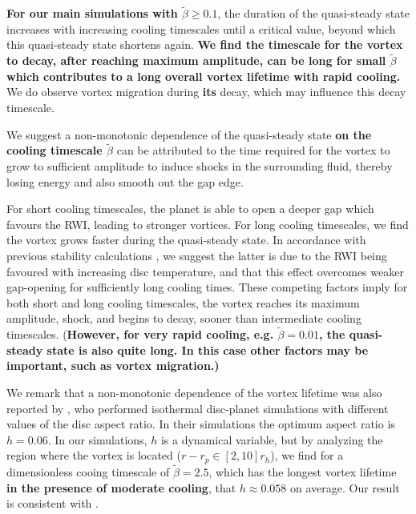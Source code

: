 {\bf For our main simulations with $\tilde{\beta}\geq 0.1$}, the duration of the quasi-steady state increases with
increasing cooling timescales until a critical value, beyond which this
quasi-steady state shortens again. {\bf We find the timescale for the vortex to
decay, after reaching maximum amplitude, can be long for small
$\tilde{\beta}$ which contributes to a long overall vortex lifetime
with rapid cooling.} We do observe vortex migration during {\bf its}
decay, which may influence this decay timescale. 
  

We suggest a non-monotonic dependence of the quasi-steady state {\bf
on the cooling timescale $\tilde{\beta}$} can
be attributed to the time required for the vortex to grow to 
sufficient amplitude to induce shocks in the surrounding fluid,
thereby losing energy and also smooth out the gap edge.   

For short cooling timescales, the planet is able to open a
deeper gap which favours the RWI, leading to stronger 
vortices. For long cooling timescales, we find the vortex
grows faster during the quasi-steady state. In accordance with
previous stability calculations \citep{li00}, we 
suggest the latter is due to the RWI being favoured with increasing
disc temperature, and that this effect overcomes weaker
gap-opening for sufficiently long cooling times. 
These competing factors imply
for both short and long cooling timescales, the vortex reaches
its maximum amplitude, shock, and begins to decay, sooner than
intermediate cooling timescales. {(\bf However, for very rapid
  cooling, e.g. $\tilde{\beta}=0.01$, the quasi-steady state is also
  quite long. In this case other factors may be important, such as
  vortex migration.)}


We remark that a non-monotonic dependence of the vortex lifetime was
also reported by \cite{fu14}, who performed isothermal disc-planet
simulations with different values of the   
disc aspect ratio. In their simulations the optimum aspect ratio is
$h=0.06$. In our simulations, $h$ is a dynamical
variable, but by analyzing the region where the vortex is located
($r-r_p\in[2,10]r_h$), %
we find for a dimensionless cooing timescale of $\tilde\beta=2.5$, which has
the longest vortex lifetime {\bf in the presence of moderate cooling}, that  
$h\approx0.058$ on average.  
Our result is consistent with \cite{fu14}.

